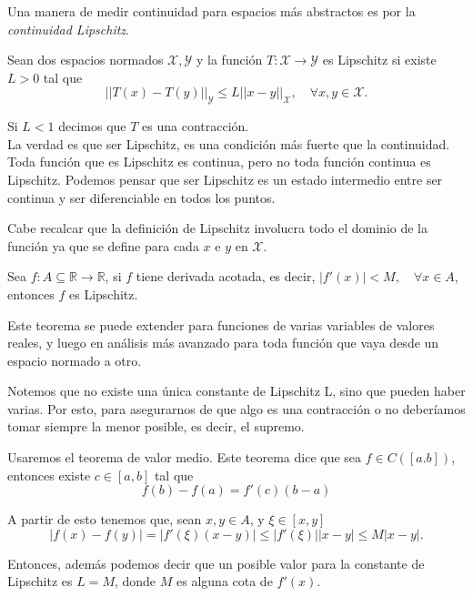 \documentclass[12pt]{book}
\begin{document}
Una manera de medir continuidad para espacios más abstractos es por la \textit{continuidad Lipschitz}.

\begin{definitionenv}
    Sean dos espacios normados $\mathcal{X}, \mathcal{Y}$ y la función $T:\mathcal{X}\to \mathcal{Y}$ es Lipschitz si existe $L>0$ tal que
    \[
        ||T(x)-T(y)||_\mathcal{Y} \leq L||x-y||_\mathcal{X}, \quad \forall x,y\in \mathcal{X}.
    \]
\end{definitionenv}

Si $L<1$ decimos que $T$ es una contracción.\\

La verdad es que ser Lipschitz, es una condición más fuerte que la continuidad. Toda función que es Lipschitz es continua, pero no toda función continua es Lipschitz. Podemos pensar que ser Lipschitz es un estado intermedio entre ser continua y ser diferenciable en todos los puntos.

Cabe recalcar que la definición de Lipschitz involucra todo el dominio de la función ya que se define para cada $x$ e $y$ en $\mathcal{X}$.

\begin{theoremenv}\label{teo:cota_lipschitz}
    Sea $f:A\subseteq\mathbb{R}\to \mathbb{R}$, si $f$ tiene derivada acotada, es decir, $|f'(x)|<M,\quad \forall x\in A$, entonces $f$ es Lipschitz.
\end{theoremenv}

Este teorema se puede extender para funciones de varias variables de valores reales, y luego en análisis más avanzado para toda función que vaya desde un espacio normado a otro.

Notemos que no existe una única constante de Lipschitz L, sino que pueden haber varias. Por esto, para asegurarnos de que algo es una contracción o no deberíamos tomar siempre la menor posible, es decir, el supremo.\\

\begin{proofenv}
Usaremos el teorema de valor medio. Este teorema dice que sea $f\in C([a.b])$, entonces existe $c\in [a,b]$ tal que
\[
    f(b)-f(a)=f'(c)(b-a)
\]

A partir de esto tenemos que, sean $x,y\in A$, y $\xi\in [x,y]$
\[
    |f(x)-f(y)|=|f'(\xi)(x-y)|\leq |f'(\xi)||x-y|\leq M|x-y|.
\]
\end{proofenv}

Entonces, además podemos decir que un posible valor para la constante de Lipschitz es $L=M$, donde $M$ es alguna cota de $f'(x)$.\\
\end{document}
